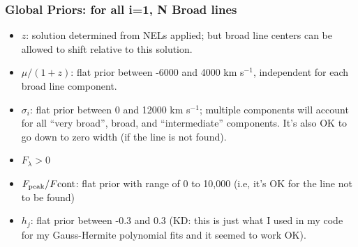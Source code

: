 \documentclass[12pt,letterpaper]{article}
\begin{document}
\subsubsection*{Global Priors: for all i=1, N Broad lines}
\begin{itemize}

  \item $z$: solution determined from NELs applied; but broad line centers can be allowed to shift relative to this solution.
  \item $\mu/(1+z)$: flat prior between -6000 and 4000 km s$^{-1}$, independent for each broad line component.
  \item $\sigma_i$: flat prior between 0 and 12000 km s$^{-1}$; multiple
    components will account for all ``very broad'', broad, and
    ``intermediate'' components.  It's also OK to go down to zero width
    (if the line is not found).
 \item $F_{\lambda} > 0$
 \item $F_{\rm peak}/F{\rm cont}$: flat prior with range of 0 to 10,000 (i.e, it's OK for the line not to be found)
 \item $h_j$: flat prior between -0.3 and 0.3 (KD: this is just what I used in my code for my Gauss-Hermite polynomial fits and it seemed to work OK).

\end{itemize}
\end{document}
